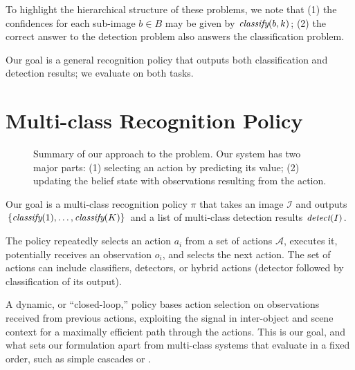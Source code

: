 To highlight the hierarchical structure of these problems, we note that (1) the confidences for each sub-image $b \in B$ may be given by $\emph{classify}(b,k)$; (2) the correct answer to the detection problem also answers the classification problem. 

Our goal is a general recognition policy that outputs both classification and detection results; we evaluate on both tasks.

\section{Multi-class Recognition Policy}
\begin{figure}[h!]
  \caption{Summary of our approach to the problem. Our system has two major parts: (1) selecting an action by predicting its value; (2) updating the belief state with observations resulting from the action.}
  \label{fig:pomdp}
\end{figure}

Our goal is a multi-class recognition policy $\pi$ that takes an image $\mathcal{I}$ and outputs $\{\emph{classify}(1), \dots, \emph{classify}(K)\}$ and a list of multi-class detection results $\emph{detect}(I)$.

The policy repeatedly selects an action $a_i$ from a set of actions $\mathcal{A}$, executes it, potentially receives an observation $o_i$, and selects the next action.
The set of actions can include classifiers, detectors, or hybrid actions (detector followed by classification of its output).

A dynamic, or ``closed-loop,'' policy bases action selection on observations received from previous actions, exploiting the signal in inter-object and scene context for a maximally efficient path through the actions.
This is our goal, and what sets our formulation apart from multi-class systems that evaluate in a fixed order, such as simple cascades \cite{Viola2001} or .

